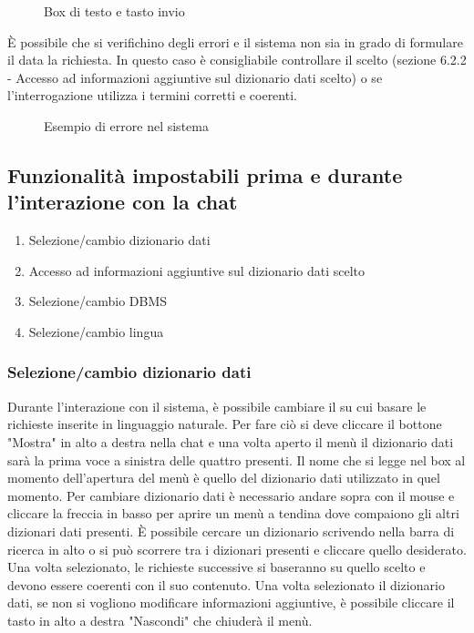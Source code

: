 \begin{figure}[H]
  \centering
  \caption{Box di testo e tasto invio}
\end{figure}

È possibile che si verifichino degli errori e il sistema non sia in grado di formulare il  data la richiesta. In questo caso è consigliabile controllare il  scelto (sezione 6.2.2 - Accesso ad informazioni aggiuntive sul dizionario dati scelto) o se l'interrogazione utilizza i termini corretti e coerenti.

\begin{figure}[H]
  \centering
  \caption{Esempio di errore nel sistema}
\end{figure}

\subsection{Funzionalità impostabili prima e durante l'interazione con la chat}

\begin{enumerate}
  \item Selezione/cambio dizionario dati
  \item Accesso ad informazioni aggiuntive sul dizionario dati scelto
  \item Selezione/cambio DBMS
  \item Selezione/cambio lingua
\end{enumerate}

\subsubsection{Selezione/cambio dizionario dati}

Durante l'interazione con il sistema, è possibile cambiare il  su cui basare le richieste inserite in linguaggio naturale. Per fare ciò si deve cliccare il bottone "Mostra" in alto a destra nella chat e una volta aperto il menù il dizionario dati sarà la prima voce a sinistra delle quattro presenti. Il nome che si legge nel box al momento dell'apertura del menù è quello del dizionario dati utilizzato in quel momento. Per cambiare dizionario dati è necessario andare sopra con il mouse e cliccare la freccia in basso per aprire un menù a tendina dove compaiono gli altri dizionari dati presenti. È possibile cercare un dizionario scrivendo nella barra di ricerca in alto o si può scorrere tra i dizionari presenti e cliccare quello desiderato. Una volta selezionato, le richieste successive si baseranno su quello scelto e devono essere coerenti con il suo contenuto. Una volta selezionato il dizionario dati, se non si vogliono modificare informazioni aggiuntive, è possibile cliccare il tasto in alto a destra "Nascondi" che chiuderà il menù.

